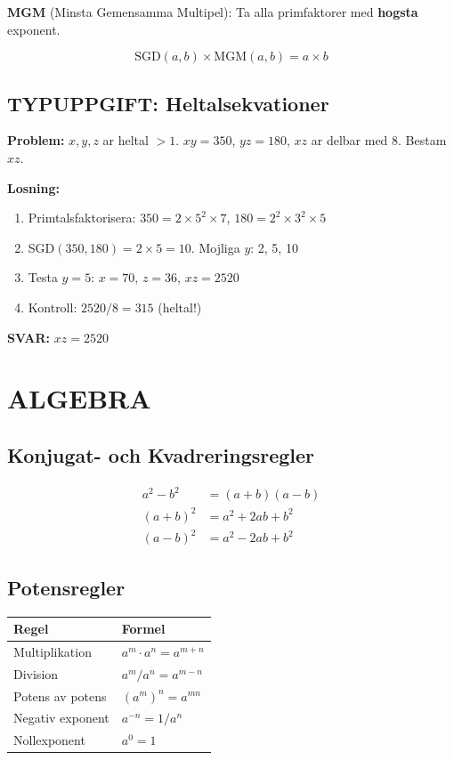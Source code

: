 \documentclass[11pt,a4paper]{article}
\begin{document}
\textbf{MGM} (Minsta Gemensamma Multipel): Ta alla primfaktorer med \textbf{hogsta} exponent.

\begin{tcolorbox}[title=Viktig formel]
\[ \text{SGD}(a,b) \times \text{MGM}(a,b) = a \times b \]
\end{tcolorbox}

\subsection{TYPUPPGIFT: Heltalsekvationer}

\textbf{Problem:} $x, y, z$ ar heltal $> 1$. $xy = 350$, $yz = 180$, $xz$ ar delbar med 8. Bestam $xz$.

\textbf{Losning:}
\begin{enumerate}
\item Primtalsfaktorisera: $350 = 2 \times 5^2 \times 7$, $180 = 2^2 \times 3^2 \times 5$
\item SGD$(350, 180) = 2 \times 5 = 10$. Mojliga $y$: 2, 5, 10
\item Testa $y = 5$: $x = 70$, $z = 36$, $xz = 2520$
\item Kontroll: $2520 / 8 = 315$ (heltal!)
\end{enumerate}

\begin{tcolorbox}[colback=green!10, colframe=green!50!black]
\textbf{SVAR:} $xz = 2520$
\end{tcolorbox}

\section{ALGEBRA}

\subsection{Konjugat- och Kvadreringsregler}

\begin{align}
a^2 - b^2 &= (a+b)(a-b) \\
(a+b)^2 &= a^2 + 2ab + b^2 \\
(a-b)^2 &= a^2 - 2ab + b^2
\end{align}

\subsection{Potensregler}

\begin{tabular}{|l|l|}
\hline
\textbf{Regel} & \textbf{Formel} \\
\hline
Multiplikation & $a^m \cdot a^n = a^{m+n}$ \\
Division & $a^m / a^n = a^{m-n}$ \\
Potens av potens & $(a^m)^n = a^{mn}$ \\
Negativ exponent & $a^{-n} = 1/a^n$ \\
Nollexponent & $a^0 = 1$ \\
\hline
\end{tabular}
\end{document}
